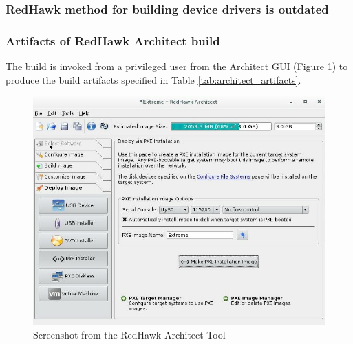\documentclass[12pt]{article}
\begin{document}
\subsubsection{RedHawk method for building device drivers is outdated}

\subsubsection{Artifacts of RedHawk Architect build}

The build is invoked from a privileged user from the Architect GUI (Figure
\ref{fig:architect_screenshot}) to produce the build artifacts specified in Table
\ref{tab:architect_artifacts}.

\begin{figure}[H]
    \begin{center}
    \includegraphics[width=1.0\textwidth]{img/architect_screenshot}
    \caption{Screenshot from the RedHawk Architect Tool}
    \label{fig:architect_screenshot}
    \end{center}
\end{figure}
\end{document}

